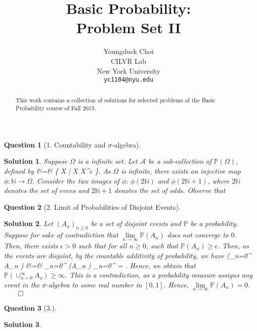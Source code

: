 \documentclass{article} %
\title{Basic Probability: \\
Problem Set II}
\author{
Youngduck Choi \\
CILVR Lab \\
New York University\\
\texttt{yc1104@nyu.edu} \\
}
\def\eQb#1\eQe{\begin{eqnarray*}#1\end{eqnarray*}}
\theoremstyle{quest}
\newtheorem*{question}{Question}
\newtheorem*{solution}{Solution}
\begin{document}
\maketitle

\begin{abstract}
This work contains a collection of solutions for selected problems 
of the Basic Probability course of Fall 2015.
\end{abstract}

\begin{question}[1. Countability and $\sigma$-algebra]
\end{question}
\begin{solution}
Suppose $\Omega$ is a infinite set. Let $\mathscr{A}$ be a sub-collection of $\mathbb{P}(\Omega)$, 
defined by 
\eQb
\mathscr{A} &=& \{ X \subseteq \Omega \> | \> X  X^c  \}. 
\eQe
As $\Omega$ is infinite, there exists an injective map $\phi:\mathbb{N} \to \Omega$. Consider
the two images of $\phi$: $\phi(2\mathbb{N})$ and $\phi(2\mathbb{N}+1)$, where $2\mathbb{N}$
denotes the set of evens and $2\mathbb{N}+1$ denotes the set of odds. Observe that 

\end{solution}

\bigskip

\begin{question}[2. Limit of Probabilities of Disjoint Events]
\end{question}
\begin{solution}
Let $( A_n )_{n \geq 0}$ be a set of disjoint events and $\mathbb{P}$ be a probability.
Suppose for sake of contradiction that $\underset{n \to \infty}{\lim} \mathbb{P}(A_n )$
does not converge to $0$. Then, there exists $\epsilon > 0$ such that for all $n \geq 0$,
such that $\mathbb{P}(A_n ) \geq \epsilon$. Then, 
as the events are disjoint, by the countable additivity of probability,
we have 
\eQb
\mathbb{P}(\cup_{n=0}^{\infty} A_n ) &=& \sum_{n=0}^{\infty} (A_n ) 
\geq \sum_{n=0}^{\infty} \epsilon = \infty. 
\eQe
Hence, we obtain that $\mathbb{P}(\cup_{n=0}^{\infty} A_n) \geq \infty$. This is a contradiction,
as a probability measure assigns any event in the $\sigma$-algebra to some real number in $[0,1]$.
Hence, $\underset{n \to \infty}{\lim} \mathbb{P}(A_n) = 0$. $\qed$
\end{solution}

\bigskip

\begin{question}[3.]
\end{question}
\begin{solution}
\end{solution}
\end{document}
